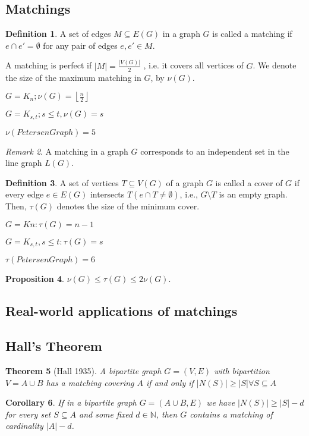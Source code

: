 \documentclass[11pt, fleqn, a4paper, landscape]{article}
\theoremstyle{plain} %
\newtheorem{thm}{Theorem}
\newtheorem{pro}[thm]{Proposition}
\newtheorem{cor}[thm]{Corollary}
\theoremstyle{remark} %
\newtheorem{rem}[thm]{Remark}
\theoremstyle{definition} %
\newtheorem{defi}[thm]{Definition}
\begin{document}
\begin{multicols}{3}
\section{Matchings}
\begin{defi}
A set of edges $M \subseteq E(G)$ in a graph $G$ is called a matching if $e \cap e' = \emptyset$ for any pair of edges $e, e' \in M$.

A matching is perfect if $|M|=\frac{|V (G)|}{2}$ , i.e. it covers all vertices of $G$. We denote the size of the maximum matching in $G$, by $\nu(G)$.

$G=K_n; \nu(G)=\left\lfloor\frac{n}{2}\right\rfloor$

$G=K_{s,t}; s\le t, \nu(G)=s$

$\nu(Petersen Graph)=5$
\end{defi}
\addtocounter{thm}{1}
\begin{rem}
A matching in a graph $G$ corresponds to an independent set in the line graph $L(G)$.
\end{rem}
\begin{defi}
A set of vertices $T \subseteq V (G)$ of a graph  $G$ is called a cover of $G$ if every edge $e \in E(G)$ intersects $T (e \cap T \neq \emptyset)$, i.e., $G \setminus T$ is an empty graph. Then, $\tau(G)$ denotes the size of
the minimum cover.

$G = Kn: \tau(G) = n - 1$

$G = K_{s,t}, s \le t: \tau(G) = s$

$\tau(Petersen Graph)=6$
\end{defi}
\addtocounter{thm}{1}
\begin{pro}
$\nu(G) \le\tau(G) \le 2\nu(G).$
\end{pro}
\subsection{Real-world applications of matchings}

\subsection{Hall’s Theorem}
\begin{thm}[Hall 1935]
A bipartite graph $G = (V,E)$ with bipartition $V = A\cup B$ has a matching
covering $A$ if and only if $|N(S)|\ge|S|\forall S \subseteq A$
\end{thm}

\begin{cor}
 If in a bipartite graph $G = (A\cup B,E)$ we have $|N(S)|\ge|S|-d$ for every set $S \subseteq A$ and some fixed $d\in\mathbb{N}$, then $G$ contains a matching of cardinality $|A|- d$.
\end{cor}


\end{multicols}
\end{document}
